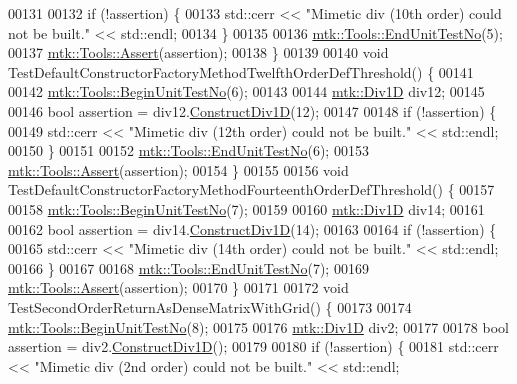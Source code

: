 \begin{DoxyCode}
00131 
00132   \textcolor{keywordflow}{if} (!assertion) \{
00133     std::cerr << \textcolor{stringliteral}{"Mimetic div (10th order) could not be built."} << std::endl;
00134   \}
00135 
00136   \hyperlink{classmtk_1_1Tools_aba67d9dc35c9c1c49430fcc9ea035e03}{mtk::Tools::EndUnitTestNo}(5);
00137   \hyperlink{classmtk_1_1Tools_ac6804df469c94ab6a796fb64f1e44a89}{mtk::Tools::Assert}(assertion);
00138 \}
00139 
00140 \textcolor{keywordtype}{void} TestDefaultConstructorFactoryMethodTwelfthOrderDefThreshold() \{
00141 
00142   \hyperlink{classmtk_1_1Tools_afc29ecaf337a13ed2e817d3890a5a441}{mtk::Tools::BeginUnitTestNo}(6);
00143 
00144   \hyperlink{classmtk_1_1Div1D}{mtk::Div1D} div12;
00145 
00146   \textcolor{keywordtype}{bool} assertion = div12.\hyperlink{classmtk_1_1Div1D_a52fcd1542f11e606e36bd188e48bfdf7}{ConstructDiv1D}(12);
00147 
00148   \textcolor{keywordflow}{if} (!assertion) \{
00149     std::cerr << \textcolor{stringliteral}{"Mimetic div (12th order) could not be built."} << std::endl;
00150   \}
00151 
00152   \hyperlink{classmtk_1_1Tools_aba67d9dc35c9c1c49430fcc9ea035e03}{mtk::Tools::EndUnitTestNo}(6);
00153   \hyperlink{classmtk_1_1Tools_ac6804df469c94ab6a796fb64f1e44a89}{mtk::Tools::Assert}(assertion);
00154 \}
00155 
00156 \textcolor{keywordtype}{void} TestDefaultConstructorFactoryMethodFourteenthOrderDefThreshold() \{
00157 
00158   \hyperlink{classmtk_1_1Tools_afc29ecaf337a13ed2e817d3890a5a441}{mtk::Tools::BeginUnitTestNo}(7);
00159 
00160   \hyperlink{classmtk_1_1Div1D}{mtk::Div1D} div14;
00161 
00162   \textcolor{keywordtype}{bool} assertion = div14.\hyperlink{classmtk_1_1Div1D_a52fcd1542f11e606e36bd188e48bfdf7}{ConstructDiv1D}(14);
00163 
00164   \textcolor{keywordflow}{if} (!assertion) \{
00165     std::cerr << \textcolor{stringliteral}{"Mimetic div (14th order) could not be built."} << std::endl;
00166   \}
00167 
00168   \hyperlink{classmtk_1_1Tools_aba67d9dc35c9c1c49430fcc9ea035e03}{mtk::Tools::EndUnitTestNo}(7);
00169   \hyperlink{classmtk_1_1Tools_ac6804df469c94ab6a796fb64f1e44a89}{mtk::Tools::Assert}(assertion);
00170 \}
00171 
00172 \textcolor{keywordtype}{void} TestSecondOrderReturnAsDenseMatrixWithGrid() \{
00173 
00174   \hyperlink{classmtk_1_1Tools_afc29ecaf337a13ed2e817d3890a5a441}{mtk::Tools::BeginUnitTestNo}(8);
00175 
00176   \hyperlink{classmtk_1_1Div1D}{mtk::Div1D} div2;
00177 
00178   \textcolor{keywordtype}{bool} assertion = div2.\hyperlink{classmtk_1_1Div1D_a52fcd1542f11e606e36bd188e48bfdf7}{ConstructDiv1D}();
00179 
00180   \textcolor{keywordflow}{if} (!assertion) \{
00181     std::cerr << \textcolor{stringliteral}{"Mimetic div (2nd order) could not be built."} << std::endl;

\end{DoxyCode}
